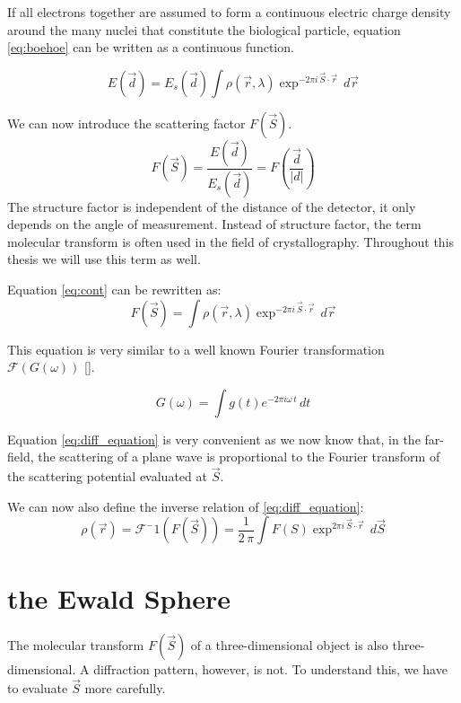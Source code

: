 If all electrons together are assumed to form a continuous electric charge density around the many nuclei that constitute the biological particle, equation \ref{eq:boehoe}  can be written as a continuous function. 

\begin{equation}\label{eq:cont}
E(\vec{d}) = E_s(\vec{d})\int \rho(\vec{r},\lambda) \exp^{-2\pi i \,\vec{S} \cdot \vec{r}}\,d\vec{r}
\end{equation}

We can now introduce the scattering factor $F(\vec{S})$.
\begin{equation}
F\left(\vec{S}\right) = \frac{E(\vec{d})}{E_s(\vec{d})} = F\left(\frac{\vec{d}}{|d|}\right)
\end{equation}
The structure factor is independent of the distance of the detector, it only depends on the angle of measurement. Instead of structure factor, the term molecular transform is often used in the field of crystallography. Throughout this thesis we will use this term as well.

Equation \ref{eq:cont} can be rewritten as:
\begin{equation}\label{eq:diff_equation}
F(\vec{S}) = \int \rho(\vec{r},\lambda) \exp^{-2\pi i \,\vec{S} \cdot \vec{r}}\,d\vec{r}
\end{equation}

This equation is very similar to a well known Fourier transformation $\mathcal{F}( G(\omega) )$ []. 

\begin{equation}
 G(\omega) = \int g(t) e^{-2 \pi i \omega\, t}\,dt
\end{equation}

Equation \ref{eq:diff_equation} is very convenient as we now know that, in the far-field, the scattering of a plane wave is proportional to the Fourier transform of the scattering potential evaluated at $\vec{S}$.

We can now also define the inverse relation of \ref{eq:diff_equation}:
\begin{equation}
\rho(\vec{r}) = \mathcal{F}^-1 ( F(\vec{S}) ) = \frac{1}{2\,\pi}\int F(S) \exp^{2\pi i \,\vec{S} \cdot \vec{r}}\,d\vec{S}
\end{equation}


\section{the Ewald Sphere}

The molecular transform $F(\vec{S})$ of a three-dimensional object is also three-dimensional. A diffraction pattern, however, is not. To understand this, we have to evaluate $\vec{S}$ more carefully. 

